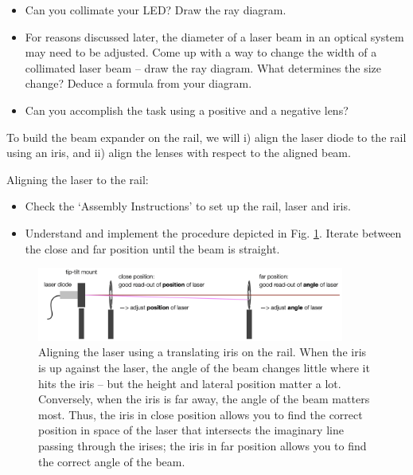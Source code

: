 \documentclass[a4paper]{report}
\begin{document}
    \begin{itemize}
        \item Can you collimate your LED? Draw the ray diagram.
		\item For reasons discussed later, the diameter of a laser beam in an optical system may need to be adjusted. Come up with a way to change the width of a collimated laser beam -- draw the ray diagram. What determines the size change? Deduce a formula from your diagram.
	    \item Can you accomplish the task using a positive and a negative lens?
	\end{itemize}

    \noindent
	To build the beam expander on the rail, we will i) align the laser diode to the rail using an iris, and ii) align the lenses with respect to the aligned beam.


    \noindent
	Aligning the laser to the rail:
	\begin{itemize}
	    \item Check the `Assembly Instructions' to set up the rail, laser and iris.
	    \item Understand and implement the procedure depicted in Fig. \ref{fig:laser_alignment}. Iterate between the close and far position until the beam is straight.
	\end{itemize}


	\begin{figure}[h]
		\center
		\includegraphics[width=0.9\textwidth]{figures/laser_alignment.png}
		\captionsetup{width=0.9\textwidth}
		\caption{Aligning the laser using a translating iris on the rail. When the iris is up against the laser, the angle of the beam changes little where it hits the iris -- but the height and lateral position matter a lot. Conversely, when the iris is far away, the angle of the beam matters most. Thus, the iris in close position allows you to find the correct position in space of the laser that intersects the imaginary line passing through the irises; the iris in far position allows you to find the correct angle of the beam.}
		\label{fig:laser_alignment}
	\end{figure}
\end{document}
